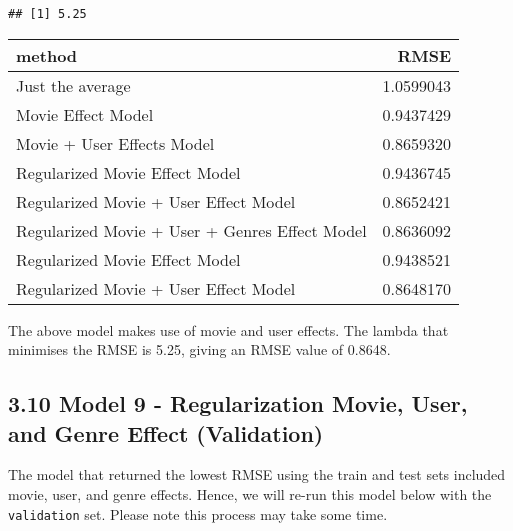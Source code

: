 \documentclass[]{article}
\newenvironment{Shaded}{\begin{snugshade}}{\end{snugshade}}
\newcommand{\DataTypeTok}[1]{\textcolor[rgb]{0.13,0.29,0.53}{#1}}
\newcommand{\KeywordTok}[1]{\textcolor[rgb]{0.13,0.29,0.53}{\textbf{#1}}}
\newcommand{\NormalTok}[1]{#1}
\newcommand{\OperatorTok}[1]{\textcolor[rgb]{0.81,0.36,0.00}{\textbf{#1}}}
\newcommand{\StringTok}[1]{\textcolor[rgb]{0.31,0.60,0.02}{#1}}
\begin{document}
\begin{verbatim}
## [1] 5.25
\end{verbatim}

\begin{Shaded}
\end{Shaded}

\begin{longtable}[]{@{}lr@{}}
\toprule
method & RMSE\tabularnewline
\midrule
\endhead
Just the average & 1.0599043\tabularnewline
Movie Effect Model & 0.9437429\tabularnewline
Movie + User Effects Model & 0.8659320\tabularnewline
Regularized Movie Effect Model & 0.9436745\tabularnewline
Regularized Movie + User Effect Model & 0.8652421\tabularnewline
Regularized Movie + User + Genres Effect Model &
0.8636092\tabularnewline
Regularized Movie Effect Model & 0.9438521\tabularnewline
Regularized Movie + User Effect Model & 0.8648170\tabularnewline
\bottomrule
\end{longtable}

The above model makes use of movie and user effects. The lambda that
minimises the RMSE is 5.25, giving an RMSE value of 0.8648.

\hypertarget{model-9---regularization-movie-user-and-genre-effect-validation-1}{%
\subsection{3.10 Model 9 - Regularization Movie, User, and Genre Effect
(Validation)}\label{model-9---regularization-movie-user-and-genre-effect-validation-1}}

The model that returned the lowest RMSE using the train and test sets
included movie, user, and genre effects. Hence, we will re-run this
model below with the \texttt{validation} set. Please note this process
may take some time.
\end{document}
